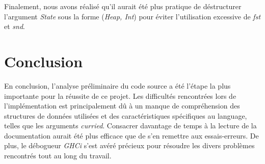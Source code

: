 \documentclass[12pt]{article}
\begin{document}
   Finalement, nous avons réalisé qu'il aurait été plus pratique de déstructurer l'argument \textit{State} sous la forme (\textit{Heap, Int}) pour éviter l'utilisation excessive de \textit{fst} et \textit{snd}.


\section{Conclusion}

En conclusion, l'analyse préliminaire du code source a été l'étape la plus importante pour la réussite de ce projet. Les difficultés rencontrées lors de l'implémentation est principalement dû à un manque de compréhension des structures de données utilisées et des caractéristiques spécifiques au language, telles que les arguments \textit{curried}. Consacrer davantage de temps à la lecture de la documentation aurait été plus efficace que de s'en remettre aux essais-erreurs. De plus, le débogueur \textit{GHCi} s'est avéré précieux pour résoudre les divers problèmes rencontrés tout au long du travail.
\end{document}
